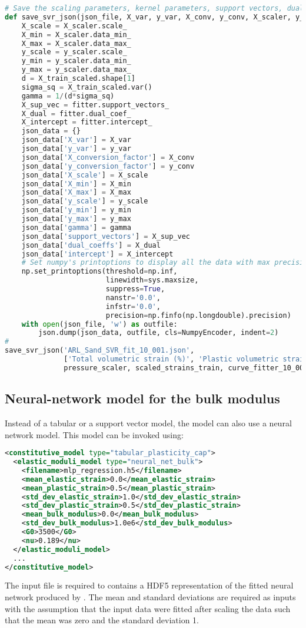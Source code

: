 \begin{lstlisting}[language=Python]
# Save the scaling parameters, kernel parameters, support vectors, duals, and intercept
def save_svr_json(json_file, X_var, y_var, X_conv, y_conv, X_scaler, y_scaler, X_train_scaled, fitter):
    X_scale = X_scaler.scale_
    X_min = X_scaler.data_min_
    X_max = X_scaler.data_max_
    y_scale = y_scaler.scale_
    y_min = y_scaler.data_min_
    y_max = y_scaler.data_max_
    d = X_train_scaled.shape[1]
    sigma_sq = X_train_scaled.var()
    gamma = 1/(d*sigma_sq)
    X_sup_vec = fitter.support_vectors_
    X_dual = fitter.dual_coef_
    X_intercept = fitter.intercept_
    json_data = {}
    json_data['X_var'] = X_var
    json_data['y_var'] = y_var
    json_data['X_conversion_factor'] = X_conv
    json_data['y_conversion_factor'] = y_conv
    json_data['X_scale'] = X_scale
    json_data['X_min'] = X_min
    json_data['X_max'] = X_max
    json_data['y_scale'] = y_scale
    json_data['y_min'] = y_min
    json_data['y_max'] = y_max
    json_data['gamma'] = gamma
    json_data['support_vectors'] = X_sup_vec
    json_data['dual_coeffs'] = X_dual
    json_data['intercept'] = X_intercept
    # Set numpy's printoptions to display all the data with max precision
    np.set_printoptions(threshold=np.inf,
                        linewidth=sys.maxsize,
                        suppress=True,
                        nanstr='0.0',
                        infstr='0.0', 
                        precision=np.finfo(np.longdouble).precision)     
    with open(json_file, 'w') as outfile:
        json.dump(json_data, outfile, cls=NumpyEncoder, indent=2)
#
save_svr_json('ARL_Sand_SVR_fit_10_001.json', 
              ['Total volumetric strain (%)', 'Plastic volumetric strain (%)'], 
              pressure_scaler, scaled_strains_train, curve_fitter_10_001)
\end{lstlisting}


\subsection{Neural-network model for the bulk modulus}
Instead of a tabular or a support vector model, the  model can also use
a neural network model.  This model can be invoked using:
\begin{lstlisting}[language=XML]
<constitutive_model type="tabular_plasticity_cap">
  <elastic_moduli_model type="neural_net_bulk">
    <filename>mlp_regression.h5</filename>
    <mean_elastic_strain>0.0</mean_elastic_strain>
    <mean_plastic_strain>0.5</mean_plastic_strain>
    <std_dev_elastic_strain>1.0</std_dev_elastic_strain>
    <std_dev_plastic_strain>0.5</std_dev_plastic_strain>
    <mean_bulk_modulus>0.0</mean_bulk_modulus>
    <std_dev_bulk_modulus>1.0e6</std_dev_bulk_modulus>
    <G0>3500</G0>
    <nu>0.189</nu>
  </elastic_moduli_model>
  ...
</constitutive_model>
\end{lstlisting}
The input file is required to contains a HDF5 representation of the fitted neural network 
produced by .  The mean and standard deviations are required as inputs
with the assumption that the input data were fitted after scaling the data such that the
mean was zero and the standard deviation 1.

